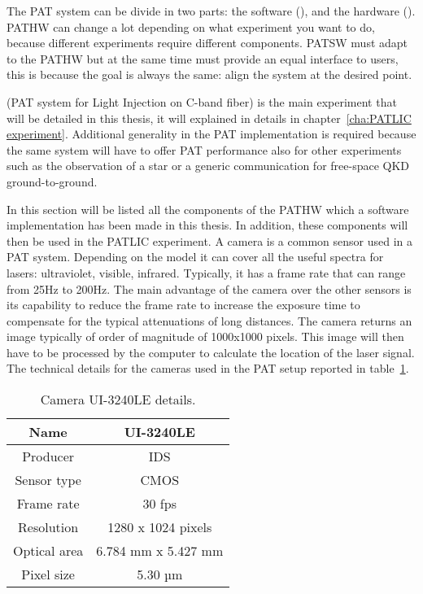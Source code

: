 The PAT system can be divide in two parts: the software (), and the hardware ().
PATHW can change a lot depending on what experiment you want to do, because different experiments require different components. PATSW must adapt to the PATHW but at the same time must provide an equal interface to users, this is because the goal is always the same: align the system at the desired point.

 (PAT system for Light Injection on C-band fiber) is the main experiment that will be detailed in this thesis, it will explained in details in chapter~\ref{cha:PATLIC experiment}.
Additional generality in the PAT implementation is required because the same system will have to offer PAT performance also for other experiments such as the observation of a star or a generic communication for free-space QKD ground-to-ground.

In this section will be listed all the components of the PATHW which a software implementation has been made in this thesis. In addition, these components will then be used in the PATLIC experiment.
A camera is a common sensor used in a PAT system. Depending on the model it can cover all the useful spectra for lasers: ultraviolet, visible, infrared.
Typically, it has a frame rate that can range from 25Hz to 200Hz. The main advantage of the camera over the other sensors is its capability to reduce the frame rate to increase the exposure time to compensate for the typical attenuations of long distances.
The camera returns an image typically of order of magnitude of 1000x1000 pixels. This image will then have to be processed by the computer to calculate the location of the laser signal.
The technical details for the cameras used in the PAT setup reported in table~\ref{table:1}.

\begin{table}[h!]
  \centering
  \begin{tabular}{ |c|c| }
    \hline
    Name         & UI-3240LE           \\\hline
    Producer     & IDS                 \\\hline
    Sensor type  & CMOS                \\\hline
    Frame rate   & 30 fps              \\\hline
    Resolution   & 1280 x 1024 pixels  \\\hline
    Optical area & 6.784 mm x 5.427 mm \\\hline
    Pixel size   & 5.30 µm             \\\hline
  \end{tabular}
  \caption{Camera UI-3240LE details.}
  \label{table:1}
\end{table}

